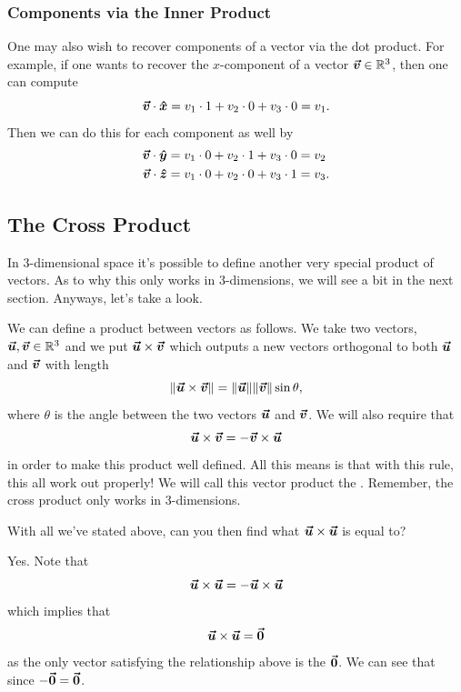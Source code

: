         \subsubsection{Components via the Inner Product}
            One may also wish to recover components of a vector via the dot product.  For example, if one wants to recover the $x$-component of a vector $\boldsymbol{\boldsymbol{\vec{v}}} \in \mathbb{R}^3$, then one can compute
            \[
            \boldsymbol{\boldsymbol{\vec{v}}} \cdot \boldsymbol{\hat{x}} = v_1 \cdot 1 + v_2 \cdot 0 + v_3 \cdot 0 = v_1.
            \]
            Then we can do this for each component as well by
            \begin{align*}
                \boldsymbol{\boldsymbol{\vec{v}}} \cdot \boldsymbol{\hat{y}} &= v_1 \cdot 0 + v_2 \cdot 1 + v_3 \cdot 0 = v_2\\
                \boldsymbol{\boldsymbol{\vec{v}}} \cdot \boldsymbol{\hat{z}} &= v_1 \cdot 0 + v_2 \cdot 0 + v_3 \cdot 1 = v_3.
            \end{align*}
            
        
        
    \subsection{The Cross Product}
        In 3-dimensional space it's possible to define another very special product of vectors.  As to why this only works in 3-dimensions, we will see a bit in the next section.  Anyways, let's take a look.
        
        We can define a product between vectors as follows. We take two vectors, $\boldsymbol{\boldsymbol{\vec{u}}},\boldsymbol{\boldsymbol{\vec{v}}} \in \mathbb{R}^3$ and we put $\boldsymbol{\boldsymbol{\vec{u}}}\times \boldsymbol{\boldsymbol{\vec{v}}}$ which outputs a new vectors orthogonal to both $\boldsymbol{\boldsymbol{\vec{u}}}$ and $\boldsymbol{\boldsymbol{\vec{v}}}$ with length
        \[
        \|\boldsymbol{\boldsymbol{\vec{u}}}\times \boldsymbol{\boldsymbol{\vec{v}}}\|=\|\boldsymbol{\boldsymbol{\vec{u}}}\|\|\boldsymbol{\boldsymbol{\vec{v}}}\|\sin \theta,
        \]
        where $\theta$ is the angle between the two vectors $\boldsymbol{\boldsymbol{\vec{u}}}$ and $\boldsymbol{\boldsymbol{\vec{v}}}$. We will also require that
        \[
        \boldsymbol{\boldsymbol{\vec{u}}} \times \boldsymbol{\boldsymbol{\vec{v}}}=-\boldsymbol{\boldsymbol{\vec{v}}} \times \boldsymbol{\boldsymbol{\vec{u}}}
        \]
        in order to make this product well defined.  All this means is that with this rule, this all work out properly! We will call this vector product the . Remember, the cross product only works in 3-dimensions.
        
        \begin{question}
        With all we've stated above, can you then find what $\boldsymbol{\boldsymbol{\vec{u}}}\times \boldsymbol{\boldsymbol{\vec{u}}}$ is equal to?
        \end{question}
        
        \begin{question}
        Yes.  Note that
        \[
        \boldsymbol{\boldsymbol{\vec{u}}}\times \boldsymbol{\boldsymbol{\vec{u}}}=-\boldsymbol{\boldsymbol{\vec{u}}}\times \boldsymbol{\boldsymbol{\vec{u}}}
        \]
        which implies that
        \[
        \boldsymbol{\boldsymbol{\vec{u}}}\times \boldsymbol{\boldsymbol{\vec{u}}}=\boldsymbol{\vec{0}}
        \]
        as the only vector satisfying the relationship above is the $\boldsymbol{\vec{0}}$. We can see that since $-\boldsymbol{\vec{0}}=\boldsymbol{\vec{0}}$.
        \end{question}
        
